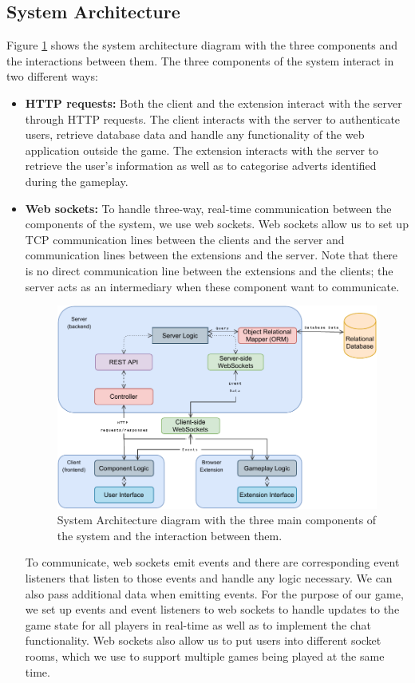 \documentclass{l4proj}
\begin{document}
\subsection{System Architecture}
Figure \ref{fig:sysarch} shows the system architecture diagram with the three components and the interactions between them. The three components of the system interact in two different ways:
\begin{itemize}
   \item
   \textbf{HTTP requests:} Both the client and the extension interact with the server through HTTP requests. The client interacts with the server to authenticate users, retrieve database data and handle any functionality of the web application outside the game. The extension interacts with the server to retrieve the user's information as well as to categorise adverts identified during the gameplay.
   \item
   \textbf{Web sockets:} To handle three-way, real-time communication between the components of the system, we use web sockets. Web sockets allow us to set up TCP communication lines between the clients and the server and communication lines between the extensions and the server. Note that there is no direct communication line between the extensions and the clients; the server acts as an intermediary when these component want to communicate. 

\begin{figure}
    \centering
    \includegraphics[width=1\linewidth]{images/sys_arch.pdf}    

    \caption{System Architecture diagram with the three main components of the system and the interaction between them.}

    \label{fig:sysarch} 
\end{figure}


To communicate, web sockets emit events and there are corresponding event listeners that listen to those events and handle any logic necessary. We can also pass additional data when emitting events. For the purpose of our game, we set up events and event listeners to web sockets to handle updates to the game state for all players in real-time as well as to implement the chat functionality. Web sockets also allow us to put users into different socket rooms, which we use to support multiple games being played at the same time.
\end{itemize}
\end{document}
